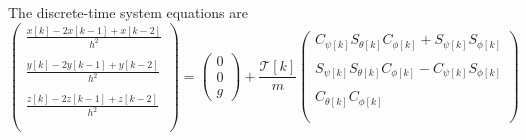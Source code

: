The discrete-time system equations are
\begin{equation}
    \left(
        \begin{array}{c}
           \frac{x[k] -2 x[k-1] + x[k-2]}{h^2} \\\\
           \frac{y[k] -2 y[k-1] + y[k-2]}{h^2} \\\\
           \frac{z[k] -2 z[k-1] + z[k-2]}{h^2}\\\\
        \end{array}
    \right)
    = \left(
       \begin{array}{c}
        0\\
        0\\
        g
      \end{array}
    \right)
    +\frac{\mathcal{T}[k]}{m}
     \left(
        \begin{array}{c}
             C_{\psi[k]}S_{\theta[k]}C_{\phi[k]} + S_{\psi[k]}S_{\phi[k]} \\\\
             S_{\psi[k]}S_{\theta[k]}C_{\phi[k]} - C_{\psi[k]}S_{\phi[k]} \\\\
             C_{\theta[k]} C_{\phi[k]} \\\\
        \end{array}
    \right)
\end{equation}
